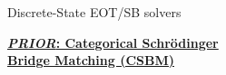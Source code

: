\documentclass[final]{beamer}
\newlength{\colwidth}
\begin{document}
\begin{frame}[t]
\begin{columns}[t]
\begin{column}{\colwidth}

    \begin{block}{Discrete-State EOT/SB solvers}
        \vspace{-0.3cm}
        \begin{minipage}[t]{0.48\linewidth}
            \begin{center}
               \underline{\textbf{\textit{PRIOR}: Categorical Schr\"odinger}} \\ \underline{\textbf{Bridge Matching (CSBM)}}
            \end{center}


\end{minipage}
\end{block}
\end{column}
\end{columns}
\end{frame}
\end{document}
